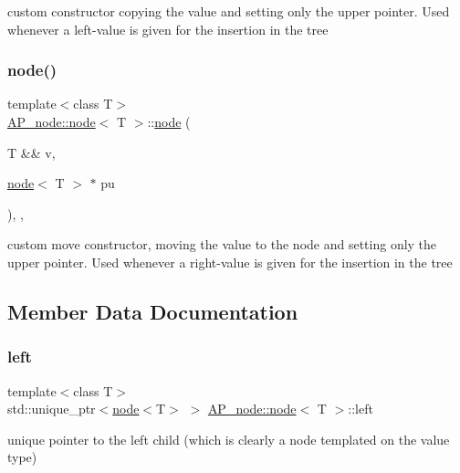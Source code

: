 custom constructor copying the value and setting only the upper pointer. Used whenever a left-\/value is given for the insertion in the tree \mbox{\label{structAP__node_1_1node_a548c79adaea5073dccf7283a7a511aac}} 
\subsubsection{\texorpdfstring{node()}{node()}\hspace{0.1cm}{\footnotesize\ttfamily [3/3]}}
{\footnotesize\ttfamily template$<$class T$>$ \\
\hyperlink{structAP__node_1_1node}{A\+P\+\_\+node\+::node}$<$ T $>$\+::\hyperlink{structAP__node_1_1node}{node} (\begin{DoxyParamCaption}\item[{T \&\&}]{v,  }\item[{\hyperlink{structAP__node_1_1node}{node}$<$ T $>$ $\ast$}]{pu }\end{DoxyParamCaption})\hspace{0.3cm}{\ttfamily [inline]}, {\ttfamily [explicit]}, {\ttfamily [noexcept]}}

custom move constructor, moving the value to the node and setting only the upper pointer. Used whenever a right-\/value is given for the insertion in the tree 

\subsection{Member Data Documentation}
\mbox{\label{structAP__node_1_1node_adde34e7c4d3d99dc9515c0c38e117e0a}} 
\subsubsection{\texorpdfstring{left}{left}}
{\footnotesize\ttfamily template$<$class T$>$ \\
std\+::unique\+\_\+ptr$<$\hyperlink{structAP__node_1_1node}{node}$<$T$>$ $>$ \hyperlink{structAP__node_1_1node}{A\+P\+\_\+node\+::node}$<$ T $>$\+::left}

unique pointer to the left child (which is clearly a node templated on the value type) \mbox{\label{structAP__node_1_1node_ab55fa203db8ddff7144bb2e4c1a336fc}} 

